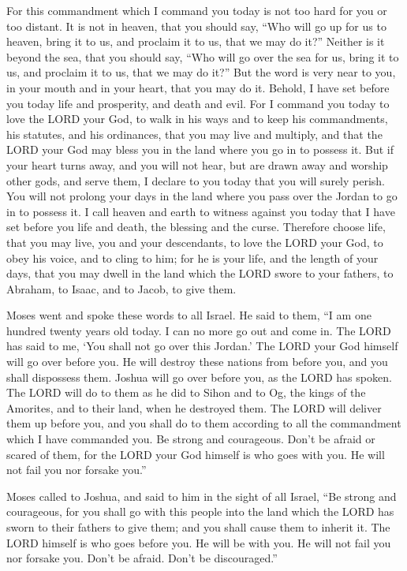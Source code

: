 \myverse{}For this commandment which I command you today is not too hard
for you or too distant.
\myverse{}It is not in heaven, that you should say, “Who will go up for us to heaven,
bring it to us, and proclaim it to us, that we may do it?”
\myverse{}Neither is it beyond the sea, that you should say, “Who will go over the
sea for us, bring it to us, and proclaim it to us, that we may do it?”
\myverse{}But the word is very near to you, in your mouth and in your heart, that you
may do it.
\myverse{}Behold, I have set before you today life and prosperity, and death and evil.
\myverse{}For I command you today to love the LORD your God, to walk in his ways and
to keep his commandments, his statutes, and his ordinances, that you may live and multiply, and that the
LORD your God may bless you in the land where you go in to possess it.
\myverse{}But if your heart turns away, and you will not hear, but are drawn away and
worship other gods, and serve them,
\myverse{}I declare to you today that you will surely perish. You will not prolong
your days in the land where you pass over the Jordan to go in to possess it.
\myverse{}I call heaven and earth to witness against you today that I have set before
you life and death, the blessing and the curse. Therefore choose life, that you may live, you and your
descendants,
\myverse{}to love the LORD your God, to obey his voice, and to cling to him; for he
is your life, and the length of your days, that you may dwell in the land which the LORD swore to your
fathers, to Abraham, to Isaac, and to Jacob, to give them.


\mychapter{} \myverse*{}Moses went and spoke these words to all Israel.
\myverse{}He said to them, “I am one hundred twenty years old today. I can no more go
out and come in. The LORD has said to me, ‘You shall not go over this Jordan.’
\myverse{}The LORD your God himself will go over before you. He will destroy these nations
from before you, and you shall dispossess them. Joshua will go over before you, as the LORD has spoken.
\myverse{}The LORD will do to them as he did to Sihon and to Og, the kings of the Amorites,
and to their land, when he destroyed them.
\myverse{}The LORD will deliver them up before you, and you shall do to them according
to all the commandment which I have commanded you.
\myverse{}Be strong and courageous. Don’t be afraid or scared of them, for the LORD your
God himself is who goes with you. He will not fail you nor forsake you.”

\myverse{}Moses called to Joshua, and said to him in the sight of all Israel,
“Be strong and courageous, for you shall go with this people into the land which the LORD has sworn to
their fathers to give them; and you shall cause them to inherit it.
\myverse{}The LORD himself is who goes before you. He will be with you. He will not fail
you nor forsake you. Don’t be afraid. Don’t be discouraged.”

